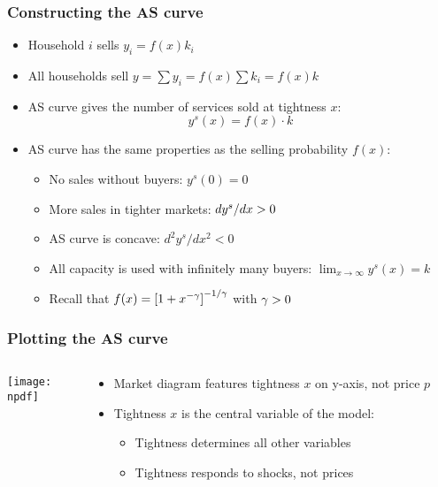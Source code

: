 \documentclass[11pt,aspectratio=169,xcolor={dvipsnames},hyperref={pdftex,pdfpagemode=UseNone,hidelinks,pdfdisplaydoctitle=true},usepdftitle=false]{beamer}
\newcommand{\npdf}{../figures/figures2.pdf}
\begin{document}
\begin{frame}
\frametitle{Constructing the AS curve}
\begin{itemize}
\item Household $i$ sells $y_i = f(x) k_i$
\item All households sell $y = \sum y_i = f(x) \sum k_i = f(x) k$
\item AS curve gives the number of services sold at tightness $x$:
\begin{equation*}
y^s(x) = f(x) \cdot k
\end{equation*}
\item AS curve has the same properties as the selling probability $f(x)$:
\begin{itemize}
\item No sales without buyers: $y^s(0) = 0$
\item More sales in tighter markets: $d y^s/d x>0$
\item AS curve is concave: $d^2 y^s/dx^2 < 0$
\item All capacity is used with infinitely many buyers: $\lim_{x\to \infty} y^s(x) = k$
\item Recall that $f(x) = \left[ 1+ x^{-\gamma} \right]^{-1/\gamma}$ with $\gamma>0$
\end{itemize}
\end{itemize}
\end{frame}

\begin{frame}
\frametitle{Plotting the AS curve}
\begin{columns}
\begin{column}{0.6\textwidth}
\texttt{[image: \\npdf]}%
\end{column}
\begin{column}{0.4\textwidth}
\begin{itemize}
	\item Market diagram features tightness $x$ on y-axis, not price $p$
	\item Tightness $x$ is the central variable of the model:
	\begin{itemize}
	\item Tightness determines all other variables
	\item Tightness responds to shocks, not prices
	\end{itemize}
\end{itemize}
\end{column}  
\end{columns} 
\end{frame}
\end{document}
